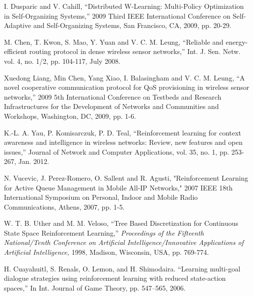 \documentclass[journal]{IEEEtran}
\begin{document}
\begin{thebibliography}{1}
I. Dusparic and V. Cahill, ``Distributed W-Learning: Multi-Policy Optimization in Self-Organizing Systems,'' 2009 Third IEEE International Conference on Self-Adaptive and Self-Organizing Systems, San Francisco, CA, 2009, pp. 20-29.


M. Chen, T. Kwon, S. Mao, Y. Yuan and V. C. M. Leung, ``Reliable and energy-efficient routing protocol in dense wireless sensor networks,'' Int. J. Sen. Netw.
 vol. 4, no. 1/2, pp. 104-117, July 2008.


Xuedong Liang, Min Chen, Yang Xiao, I. Balasingham and V. C. M. Leung, ``A novel cooperative communication protocol for QoS provisioning in wireless sensor networks,'' 2009 5th International Conference on Testbeds and Research Infrastructures for the Development of Networks and Communities and Workshops, Washington, DC, 2009, pp. 1-6.

K.-L. A. Yau, P. Komisarczuk, P. D. Teal, ``Reinforcement learning for context awareness and intelligence in wireless
networks: Review, new features and open issues,'' Journal of Network and Computer Applications, vol. 35, no. 1, pp. 253-267, Jan. 2012.

N. Vucevic, J. Perez-Romero, O. Sallent and R. Agusti, "Reinforcement Learning for Active Queue Management in Mobile All-IP Networks," 2007 IEEE 18th International Symposium on Personal, Indoor and Mobile Radio Communications, Athens, 2007, pp. 1-5.

W. T. B. Uther and M. M. Veloso, ``Tree Based Discretization for Continuous State Space Reinforcement Learning,'' \emph{Proceedings of the Fifteenth National/Tenth Conference on Artificial Intelligence/Innovative Applications of Artificial Intelligence,} 1998, Madison, Wisconsin, USA, pp. 769-774.

H. Cuayahuitl, S. Renals, O. Lemon, and H. Shimodaira. ``Learning multi-goal dialogue strategies using reinforcement learning with reduced state-action spaces,'' In Int. Journal of Game Theory, pp. 547–565, 2006.
\end{thebibliography}


\end{document}
